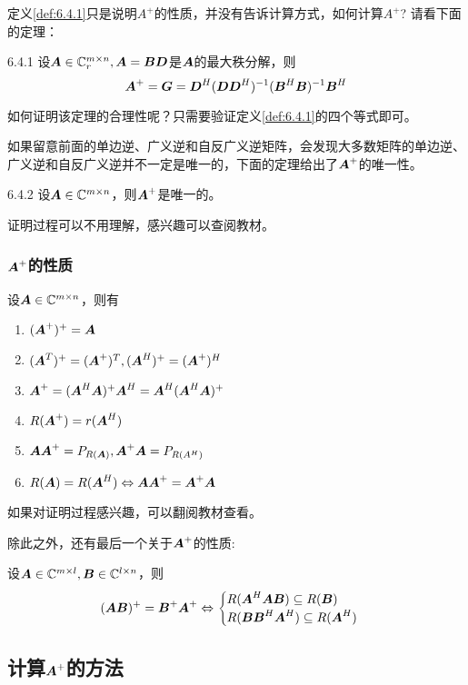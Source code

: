 \documentclass[12pt, a4paper, oneside, UTF8]{ctexbook}
\begin{document}
定义\ref{def:6.4.1}只是说明$A^+$的性质，并没有告诉计算方式，如何计算$A^+$? 请看下面的定理：
\begin{them}{}{6.4.1}
    设$\A\in\C_r^{m\times n}, \A=\B\D$是$\A$的最大秩分解，则\[\A^+=\G=\D^H(\D\D^H)^{-1}(\B^H\B)^{-1}\B^H\]
\end{them}
如何证明该定理的合理性呢？只需要验证定义\ref{def:6.4.1}的四个等式即可。

如果留意前面的单边逆、广义逆和自反广义逆矩阵，会发现大多数矩阵的单边逆、广义逆和自反广义逆并不一定是唯一的，下面的定理给出了$\A^+$的唯一性。
\begin{them}{}{6.4.2}
    设$\A\in\C^{m\times n}$，则$\A^+$是唯一的。
\end{them}

证明过程可以不用理解，感兴趣可以查阅教材。

\subsubsection{$\A^+$的性质}
\begin{them}{}{}
    设$\A\in\C^{m\times n}$，则有
    \begin{enumerate}
        \item $(\A^+)^+=\A$
        \item $(\A^T)^+=(\A^+)^T, (\A^H)^+=(\A^+)^H$
        \item $\A^+=(\A^H\A)^+\A^H=\A^H(\A^H\A)^+$
        \item $R(\A^+)=r(\A^H)$
        \item $\A\A^+=P_{R(\A)}, \A^+\A=P_{R(A^H)}$
        \item $R(\A)=R(\A^H)\Leftrightarrow \A\A^+=\A^+\A$
    \end{enumerate}
\end{them}

如果对证明过程感兴趣，可以翻阅教材查看。

除此之外，还有最后一个关于$\A^+$的性质:
\begin{them}{}{}
    设$\A\in\C^{m\times l}, \B\in\C^{l\times n}$，则\[(\A\B)^+=\B^+\A^+\Leftrightarrow\begin{cases}R(\A^H\A\B)\subseteq R(\B)\\R(\B\B^H\A^H)\subseteq 
     R(\A^H)\end{cases}\]
\end{them}

\subsection{计算$\A^+$的方法}
\end{document}
